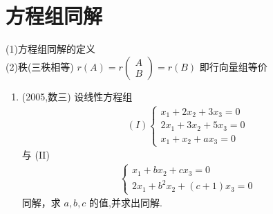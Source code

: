 \documentclass[12pt, a4paper, oneside, UTF8]{ctexbook}
\begin{document}
\section{方程组同解}
\begin{remark}[同解问题的求法]
    (1)方程组同解的定义 \\
    (2)秩(三秩相等) $r(A)=r\begin{pmatrix}
        A \\
        B
    \end{pmatrix}=r(B)$ 即行向量组等价
\end{remark}
\begin{enumerate}
    \item (2005,数三) 设线性方程组
    \begin{align*}
    (I) \begin{cases}
    x_1 + 2x_2 + 3x_3 = 0 \\
    2x_1 + 3x_2 + 5x_3 = 0 \\
    x_1 + x_2 + a x_3 = 0
    \end{cases}
    \end{align*}
    与 (II) 
    \begin{align*}
    \begin{cases}
    x_1 + b x_2 + c x_3 = 0 \\
    2x_1 + b^2 x_2 + (c+1) x_3 = 0
    \end{cases}
    \end{align*}
    同解，求 $a, b, c$ 的值,并求出同解. 
    

\end{enumerate}
\end{document}

